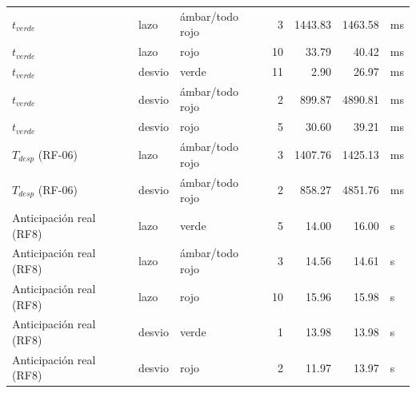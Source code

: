 \begin{table}[H]
\begin{tabular}{lllrrrl}
$t_{verde}$ & lazo & ámbar/todo rojo & 3 & 1443.83 & 1463.58 & ms \\
$t_{verde}$ & lazo & rojo & 10 & 33.79 & 40.42 & ms \\
$t_{verde}$ & desvio & verde & 11 & 2.90 & 26.97 & ms \\
$t_{verde}$ & desvio & ámbar/todo rojo & 2 & 899.87 & 4890.81 & ms \\
$t_{verde}$ & desvio & rojo & 5 & 30.60 & 39.21 & ms \\
$T_{desp}$ (RF-06) & lazo & ámbar/todo rojo & 3 & 1407.76 & 1425.13 & ms \\
$T_{desp}$ (RF-06) & desvio & ámbar/todo rojo & 2 & 858.27 & 4851.76 & ms \\
Anticipación real (RF8) & lazo & verde & 5 & 14.00 & 16.00 & s \\
Anticipación real (RF8) & lazo & ámbar/todo rojo & 3 & 14.56 & 14.61 & s \\
Anticipación real (RF8) & lazo & rojo & 10 & 15.96 & 15.98 & s \\
Anticipación real (RF8) & desvio & verde & 1 & 13.98 & 13.98 & s \\
Anticipación real (RF8) & desvio & rojo & 2 & 11.97 & 13.97 & s \\
\bottomrule
\end{tabular}
\end{table}
